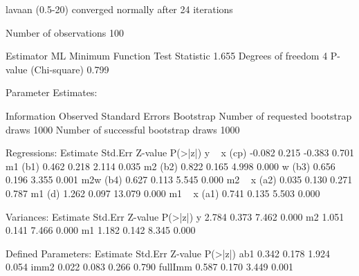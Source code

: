 \begin{Schunk}
\begin{Soutput}
lavaan (0.5-20) converged normally after  24 iterations

  Number of observations                           100

  Estimator                                         ML
  Minimum Function Test Statistic                1.655
  Degrees of freedom                                 4
  P-value (Chi-square)                           0.799

Parameter Estimates:

  Information                                 Observed
  Standard Errors                            Bootstrap
  Number of requested bootstrap draws             1000
  Number of successful bootstrap draws            1000

Regressions:
                   Estimate  Std.Err  Z-value  P(>|z|)
  y ~                                                 
    x         (cp)   -0.082    0.215   -0.383    0.701
    m1        (b1)    0.462    0.218    2.114    0.035
    m2        (b2)    0.822    0.165    4.998    0.000
    w         (b3)    0.656    0.196    3.355    0.001
    m2w       (b4)    0.627    0.113    5.545    0.000
  m2 ~                                                
    x         (a2)    0.035    0.130    0.271    0.787
    m1         (d)    1.262    0.097   13.079    0.000
  m1 ~                                                
    x         (a1)    0.741    0.135    5.503    0.000

Variances:
                   Estimate  Std.Err  Z-value  P(>|z|)
    y                 2.784    0.373    7.462    0.000
    m2                1.051    0.141    7.466    0.000
    m1                1.182    0.142    8.345    0.000

Defined Parameters:
                   Estimate  Std.Err  Z-value  P(>|z|)
    ab1               0.342    0.178    1.924    0.054
    imm2              0.022    0.083    0.266    0.790
    fullImm           0.587    0.170    3.449    0.001
\end{Soutput}
\end{Schunk}

